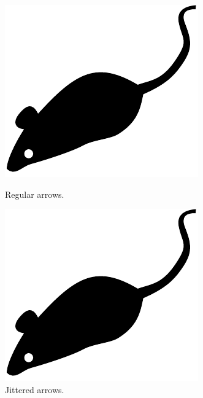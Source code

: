 \documentclass[prodmode,acmtap]{acmlarge}
\begin{document}
\begin{figure}[tp]
    \begin{minipage}[t]{0.45\linewidth}
        \centering
        \includegraphics{acmlarge-mouse}
        \caption{Regular arrows.}
        \label{regularfig}
    \end{minipage}
    \hspace{0.1\linewidth}
    \begin{minipage}[t]{0.45\linewidth}
        \centering
        \includegraphics{acmlarge-mouse}
        \caption{Jittered arrows.}
        \label{jitteredfig}
    \end{minipage}
\end{figure}
\end{document}

